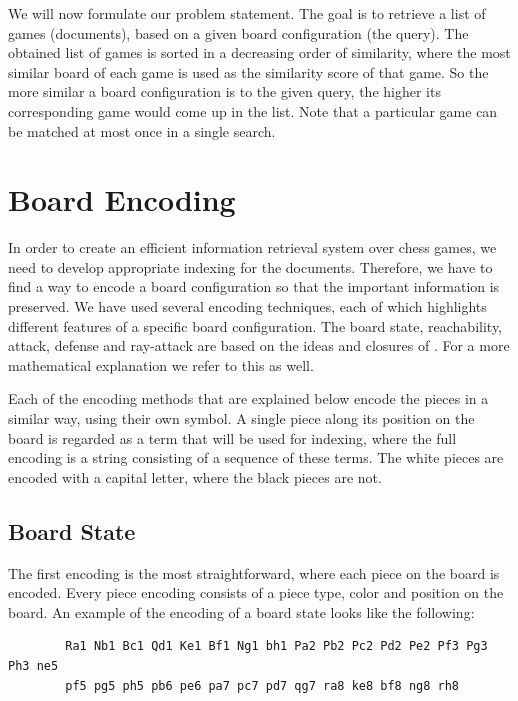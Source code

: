 \documentclass[11pt]{article}
\begin{document}
    We will now formulate our problem statement. The goal is to retrieve a list of games (documents), based on a given board configuration (the query). The obtained list of games is sorted in a decreasing order of similarity, where the most similar board of each game is used as the similarity score of that game. So the more similar a board configuration is to the given query, the higher its corresponding game would come up in the list. Note that a particular game can be matched at most once in a single search.



    \section{Board Encoding}

    In order to create an efficient information retrieval system over chess games, we need to develop appropriate indexing for the documents. Therefore, we have to find a way to encode a board configuration so that the important information is preserved. We have used several encoding techniques, each of which highlights different features of a specific board configuration. The board state, reachability, attack, defense and ray-attack are based on the ideas and closures of \cite{SimilarChessPositions}. For a more mathematical explanation we refer to this as well.

    Each of the encoding methods that are explained below encode the pieces in a similar way, using their own symbol. A single piece along its position on the board is regarded as a term that will be used for indexing, where the full encoding is a string consisting of a sequence of these terms. The white pieces are encoded with a capital letter, where the black pieces are not.

    \subsection{Board State}

    The first encoding is the most straightforward, where each piece on the board is encoded. Every piece encoding consists of a piece type, color and position on the board. An example of the encoding of a board state looks like the following:

    \begin{verbatim}
        Ra1 Nb1 Bc1 Qd1 Ke1 Bf1 Ng1 bh1 Pa2 Pb2 Pc2 Pd2 Pe2 Pf3 Pg3 Ph3 ne5
        pf5 pg5 ph5 pb6 pe6 pa7 pc7 pd7 qg7 ra8 ke8 bf8 ng8 rh8
    \end{verbatim}
\end{document}
